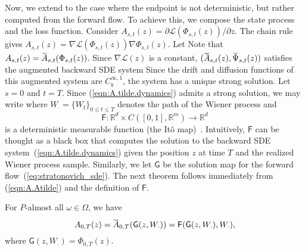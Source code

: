 \documentclass[twoside]{article}
\begin{document}
Now, we extend to the case where the endpoint is not deterministic, but rather computed from the forward flow.
To achieve this, we compose the state process and the loss function. 
Consider $A_{s, t}(z) = \partial \mathcal{L} (\Phi_{s, t}(z)) / \partial z$. 
The chain rule gives $A_{s, t}(z) = \nabla \mathcal{L}(\Phi_{s, t}(z)) \nabla \Phi_{s, t}(z)$. 
Let
Note that $A_{s, t}(z) = \widecheck{A}_{s, t} (\Phi_{s, t}(z))$. 
Since $\nabla \mathcal{L}(z)$ is a constant, $(\widecheck{A}_{s, t}(z), \widecheck{\Psi}_{s, t}(z))$ satisfies the augmented backward SDE system
Since the drift and diffusion functions of this augmented system are $C_b^{\infty, 1}$, the system has a unique strong solution.
Let $s=0$ and $t= T$.
Since (\ref{eqn:A.tilde.dynamics}) admits a strong solution, we may write
where $W_{\cdot} = \{W_t\}_{0 \leq t \leq T}$ denotes the path of the Wiener process and
\[
\mathsf{F} : \mathbb{R}^d \times C([0, 1], \mathbb{R}^m) \rightarrow \mathbb{R}^d
\]
is a deterministic measurable function (the {It\^{o} map})~\cite[Chapter V, Definition 10.9]{rogers2000diffusions2}. Intuitively, $\mathsf{F}$ can be thought as a black box that computes the solution to the backward SDE system~(\ref{eqn:A.tilde.dynamics}) given the position $z$ at time $T$ and the realized Wiener process sample. Similarly, we let $\mathsf{G}$ be the solution map for the forward flow~(\ref{eq:stratonovich_sde}). The next theorem follows immediately from (\ref{eqn:A.Atilde}) and the definition of $\mathsf{F}$.
\begin{theo} \label{thm:adjoint}
For $P$-almost all $\omega \in \Omega$, we have
\begin{equation} \label{eqn:adjoint.algorithm}
A_{0, T}(z) = \widecheck{A}_{0, T}( \mathsf{G}(z, W_{\cdot}) ) =
    \mathsf{F}(
        \mathsf{G}(z, W_{\cdot}) , W_{\cdot}
    ),
\end{equation}
where $\mathsf{G}(z, W_{\cdot}) = \Phi_{0, T}(z)$.
\end{theo}
\end{document}
